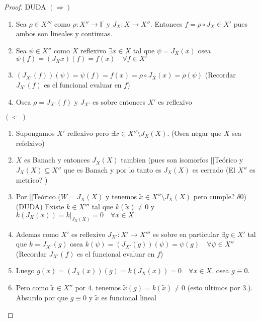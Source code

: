 \documentclass[10pt]{extarticle}
\theoremstyle{break}
\theoremstyle{definition}
\begin{document}
\begin{proof} DUDA
$(\Rightarrow)$
\begin{enumerate}
	\item Sea $\rho\in X'''$ como $\rho :X''\rightarrow\mathbb{F}$ y $J_{X}:X\rightarrow X''$. Entonces $f=\rho \circ J_{X}\in X'$ pues ambos son lineales y continuas.
	\item Sea $\psi \in X''$ como $X$ reflexivo $\exists x\in X$ tal que $\psi=J_{X}(x)$ osea $\psi(f)=(J_{X}x)(f)=f(x)\quad\forall f\in X'$
	\item $(J_{X'}(f))(\psi)=\psi(f)=f(x)=\rho\circ J_{X}(x)=\rho(\psi)$ (Recordar $J_{X'}(f)$ es el funcional evaluar en $f$)
	\item Osea $\rho = J_{X'}(f)$ y $J_{X'}$ es sobre entonces $X'$ es reflexivo
\end{enumerate}
$(\Leftarrow)$
\begin{enumerate}
	\item Supongamos $X'$ reflexivo pero $\exists \tilde{x}\in X''\setminus J_{X}(X)$. (Osea negar que $X$ sea refelxivo)
	\item $X$ es Banach y entonces $J_{X}(X)$ tambien (pues son isomorfos [[Teórico y $J_{X}(X)\subseteq X''$ que es Banach y por lo tanto es $J_{X}(X)$ es cerrado (El $X''$ es metrico? )
	\item Por [[Teórico ($W=J_{X}(X)$ y tenemos $\tilde{x}\in X''\setminus J_{X}(X)$ pero cumple? $\delta 0$) (DUDA) Existe $k\in X'''$ tal que $k(\tilde{x})\neq 0$ y $k(J_{X}(x))=k|_{J_{X}(X)}=0 \quad\forall x\in X$
	\item Ademas como $X'$ es reflexivo $J_{X'}:X'\rightarrow X'''$ es sobre en particular $\exists g\in X'$ tal que $k=J_{X'}(g)$ osea $k(\psi)=(J_{X'}(g))(\psi)=\psi(g)\quad\forall \psi\in X''$ (Recordar $J_{X'}(f)$ es el funcional evaluar en $f$)
	\item Luego $g(x)=(J_{X}(x))(g)=k(J_{X}(x))=0\quad\forall x\in X$. osea $g\equiv 0$.
	\item Pero como $\tilde{x}\in X''$ por $4.$ tenemos $\tilde{x}(g)=k(\tilde{x})\neq 0$ (esto ultimos por $3.$). Absurdo por que $g\equiv 0$ y $\tilde{x}$ es funcional lineal
\end{enumerate}
\end{proof}
\end{document}
